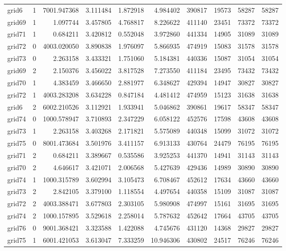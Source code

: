\begin{longtable}{|l|r|r|r|r|r|r|r|r|r|}
grid6 & 1 & 7001.947368 & 3.111484 & 1.872918 & 4.984402 & 390817 & 19573 & 58287 & 58287 \\
grid69 & 1 & 1.097744 & 3.457805 & 4.768817 & 8.226622 & 411140 & 23451 & 73372 & 73372 \\
grid71 & 1 & 0.684211 & 3.420812 & 0.552048 & 3.972860 & 441334 & 14905 & 31089 & 31089 \\
grid72 & 0 & 4003.020050 & 3.890838 & 1.976097 & 5.866935 & 474919 & 15083 & 31578 & 31578 \\
grid73 & 0 & 2.263158 & 3.433321 & 1.751060 & 5.184381 & 440336 & 15087 & 31054 & 31054 \\
grid69 & 2 & 2.150376 & 3.456022 & 3.817528 & 7.273550 & 411184 & 23495 & 73432 & 73432 \\
grid70 & 1 & 4.383459 & 3.466650 & 2.881977 & 6.348627 & 429394 & 14947 & 30827 & 30827 \\
grid72 & 1 & 4003.283208 & 3.634228 & 0.847184 & 4.481412 & 474959 & 15123 & 31638 & 31638 \\
grid6 & 2 & 6002.210526 & 3.112921 & 1.933941 & 5.046862 & 390861 & 19617 & 58347 & 58347 \\
grid74 & 0 & 1000.578947 & 3.710893 & 2.347229 & 6.058122 & 452576 & 17598 & 43608 & 43608 \\
grid73 & 1 & 2.263158 & 3.403268 & 2.171821 & 5.575089 & 440348 & 15099 & 31072 & 31072 \\
grid75 & 0 & 8001.473684 & 3.501976 & 3.411157 & 6.913133 & 430764 & 24479 & 76195 & 76195 \\
grid71 & 2 & 0.684211 & 3.389667 & 0.535586 & 3.925253 & 441370 & 14941 & 31143 & 31143 \\
grid70 & 2 & 4.646617 & 3.421071 & 2.006568 & 5.427639 & 429436 & 14989 & 30890 & 30890 \\
grid74 & 1 & 1000.315789 & 3.602994 & 3.105473 & 6.708467 & 452612 & 17634 & 43660 & 43660 \\
grid73 & 2 & 2.842105 & 3.379100 & 1.118554 & 4.497654 & 440358 & 15109 & 31087 & 31087 \\
grid72 & 2 & 4003.388471 & 3.677803 & 2.303105 & 5.980908 & 474997 & 15161 & 31695 & 31695 \\
grid74 & 2 & 1000.157895 & 3.529618 & 2.258014 & 5.787632 & 452642 & 17664 & 43705 & 43705 \\
grid76 & 0 & 9001.368421 & 3.323588 & 1.422088 & 4.745676 & 431120 & 14368 & 29827 & 29827 \\
grid75 & 1 & 6001.421053 & 3.613047 & 7.333259 & 10.946306 & 430802 & 24517 & 76246 & 76246 \\

\end{longtable}
